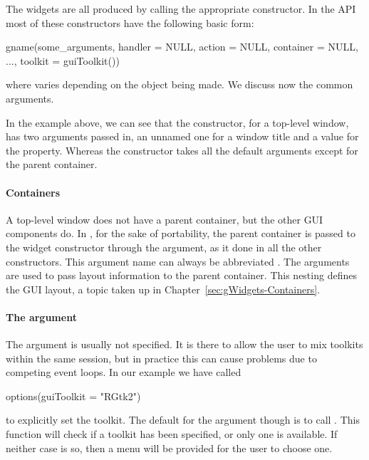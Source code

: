 The widgets are all produced by calling the appropriate constructor.
In the  API most of these constructors have the
following basic form:
\begin{Schunk}
\begin{Sinput}
 gname(some_arguments, handler = NULL, action = NULL, 
       container = NULL, ..., toolkit = guiToolkit())
\end{Sinput}
\end{Schunk}
where  varies depending on the object being
made. We discuss now the common arguments.


In the example above, we can see that the  constructor, for a
top-level window, has two arguments passed in, an unnamed one for a
window title and a value for the  property. Whereas the
 constructor takes all the default arguments except for
the parent container.

\paragraph{Containers}

A top-level window does not have a parent container, but the other GUI
components do. In , for the
sake of portability, the parent container is passed to the widget
constructor through the  argument, as it done in all
the other constructors.  This argument name can always be abbreviated
. The  arguments are used to pass layout
information to the parent container. This nesting defines the GUI
layout, a topic taken up in Chapter~\ref{sec:gWidgets-Containers}.

\paragraph{The  argument}
The  argument is usually not specified. It is there to
allow the user to mix toolkits within the same \R\/ session, but in
practice this can cause problems due to competing event loops. 
In our example we have called
\begin{Schunk}
\begin{Sinput}
 options(guiToolkit = "RGtk2")
\end{Sinput}
\end{Schunk}
%
to explicitly set the toolkit. The default for the 
argument though is to call . This function
will check if a toolkit has been specified, or only one is
available. If neither case is so, then a menu will be provided for the
user to choose one.


